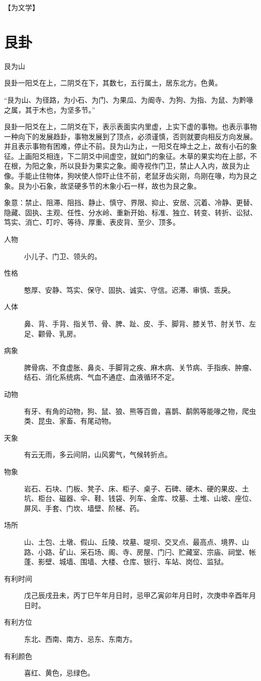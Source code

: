 \documentclass[12pt,oneside]{book}
\begin{document}
【为文学】


\section{艮卦}
艮为山

艮卦一阳爻在上，二阴爻在下，其数七，五行属土，居东北方。色黄。

“艮为山、为径路，为小石、为门、为果瓜、为阍寺、为狗、为指、为鼠、为黔喙之属，其于木也，为坚多节。”

艮卦一阳爻在上，二阴爻在下，表示表面实内里虚，上实下虚的事物。也表示事物一种向下的发展趋卦，事物发展到了顶点，必须谨慎，否则就要向相反方向发展。并且表示事物有困难，停止不前。艮为山为止，一阳爻在坤土之上，故有小石的象征。上画阳爻相连，下二阴爻中间虚空，就如门的象征。木草的果实均在上部，不在根，为阳之象，所以艮卦为果实之象。阍寺视作门卫，禁止人入内，故艮为止像。手能止住物体，狗吠使人惊吓止住不前，老鼠牙齿尖刚，鸟刚在喙，均为艮之象。艮为小石象，故坚硬多节的木象小石一样，故也为艮之象。


象意：禁止、阻滞、阻挡、静止、慎守、界限、抑止、安居、沉着、冷静、更替、隐藏、固执、主观、任性、分水岭、重新开始、标准、独立、转变、转折、讼狱、笃实、消亡、叮咛、等待、厚重、表皮背、至少、顶多。

\begin{description}
\item[人物] 小儿子、门卫、领头的。
\item[性格] 憨厚、安静、笃实、保守、固执、诚实、守信。迟滞、审慎、乖戾。
\item[人体] 鼻、背、手背、指关节、骨、脾、趾、皮、手、脚背、膝关节、肘关节、左足、颧骨、乳房。
\item[病象] 脾骨病、不食虚胀、鼻炎、手脚背之疾、麻木病、关节病、手指疾、肿瘤、结石、消化系统病、气血不通症、血液循环不定。
\item[动物] 有牙、有角的动物，狗、鼠、狼、熊等百兽，喜鹊、鹬鹘等能喙之物，爬虫类、昆虫、家畜、有尾动物。
\item[天象] 有云无雨，多云间阴，山风雾气，气候转折点。
\item[物象] 岩石、石块、门板、凳子、床、柜子、桌子、石碑、硬木、硬的果皮、土坑、柜台、磁器、伞、鞋、钱袋、列车、金库、坟墓、土堆、山坡、座位、屏风、手套、门坎、墙壁、阶梯、药。
\item[场所] 山、土包、土墩、假山、丘陵、坟墓、堤坝、交叉点、最高点、境界、山路、小路、矿山、采石场、阁、寺、房屋、门闩、贮藏室、宗庙、祠堂、帐蓬、影壁、城墙、围墙、大楼、仓库、银行、车站、岗位、监狱。
\item[有利时间] 戊己辰戌丑未，丙丁巳午年月日时，忌甲乙寅卯年月日时，次庚申辛酉年月日时。
\item[有利方位] 东北、西南、南方、忌东、东南方。
\item[有利颜色] 喜红、黄色，忌绿色。
\end{description}
\end{document}
